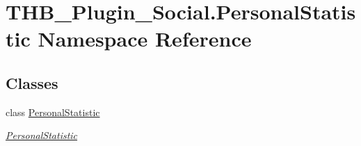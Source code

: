 \hypertarget{namespace_t_h_b___plugin___social_1_1_personal_statistic}{}\section{T\+H\+B\+\_\+\+Plugin\+\_\+\+Social.\+Personal\+Statistic Namespace Reference}
\label{namespace_t_h_b___plugin___social_1_1_personal_statistic}
\subsection*{Classes}
\begin{DoxyCompactItemize}
\item 
class \mbox{\hyperlink{class_t_h_b___plugin___social_1_1_personal_statistic_1_1_personal_statistic}{Personal\+Statistic}}
\begin{DoxyCompactList}\small\item\em \mbox{\hyperlink{class_t_h_b___plugin___social_1_1_personal_statistic_1_1_personal_statistic}{Personal\+Statistic}} \end{DoxyCompactList}\end{DoxyCompactItemize}
